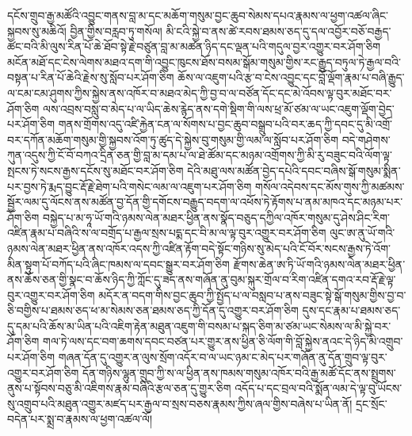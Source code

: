 
\normalsize
{}

{\ti
དངོས་གྲུབ་རྒྱ་མཚོའི་འབྱུང་གནས་བླ་མ་དང་མཆོག་གསུམ་བྱང་ཆུབ་སེམས་དཔའ་རྣམས་ལ་ཕྱག་འཚལ་ཞིང་སྐྱབས་སུ་མཆིའོ།
བྱིན་གྱིས་བརླབ་ཏུ་གསོལ།
མི་ངའི་སྐྱེ་བ་ནས་ཚེ་རབས་ཐམས་ཅད་དུ་དལ་འབྱོར་བཅོ་བརྒྱད་ཚང་བའི་མི་ལུས་རིན་པོ་ཆེ་ཐོབ་སྟེ་རྗེ་བཙུན་བླ་མ་མཚན་ཉིད་དང་ལྡན་པའི་གདུལ་བྱར་འགྱུར་བར་ཤོག་ཅིག
མངོན་མཐོ་དང་ངེས་ལེགས་མཐའ་དག་གི་འབྱུང་ཁུངས་ཐོས་བསམ་སྒོམ་གསུམ་གྱིས་རང་རྒྱུད་བཏུལ་ཏེ་རྒྱལ་བའི་བསྟན་པ་རིན་པོ་ཆེའི་རྗེས་སུ་སློབ་པར་ཤོག་ཅིག
ཆོས་ལ་འཇུག་པའི་རྩ་བ་ངེས་འབྱུང་དང་བློ་ལྡོག་རྣམ་པ་བཞི་རྒྱུད་ལ་ངམ་ངམ་ཤུགས་ཀྱིས་སྐྱེས་ནས་འཁོར་བ་མཐའ་མེད་ཀྱི་བྱ་བ་ལ་བཙོན་དོང་དང་མེ་འོབས་ལྟ་བུར་མཐོང་བར་ཤོག་ཅིག
ལས་འབྲས་བསླུ་བ་མེད་པ་ལ་ཡིད་ཆེས་རྙེད་ནས་དགེ་སྡིག་གི་ལས་ཕྲ་མོ་ཙམ་ལ་ཡང་འཇུག་ལྡོག་བྱེད་པར་ཤོག་ཅིག
གནས་གྲོགས་འདུ་འཛི་རྐྱེན་ངན་ལ་སོགས་པ་བྱང་ཆུབ་བསྒྲུབ་པའི་བར་ཆད་ཀྱི་དབང་དུ་མི་འགྲོ་བར་དཀོན་མཆོག་གསུམ་གྱི་སྐྱབས་འོག་ཏུ་ཚུད་དེ་སྐྱེས་བུ་གསུམ་གྱི་ལམ་ལ་སློབ་པར་ཤོག་ཅིག
བདེ་གཤེགས་ཀུན་འདུས་ཀྱི་ངོ་བོ་བཀའ་དྲིན་ཅན་གྱི་བླ་མ་དམ་པ་ལ་ཐེ་ཚོམ་དང་མཉམ་འགྲོགས་ཀྱི་མི་རུ་བཟུང་བའི་ལོག་ལྟ་སྤངས་ཏེ་སངས་རྒྱས་དངོས་སུ་མཐོང་བར་ཤོག་ཅིག
དེའི་མཐུ་ལས་མཚོན་བྱེད་དཔེའི་དབང་བཞིས་སྒོ་གསུམ་སྨིན་པར་བྱས་ཏེ་རྨད་བྱུང་རྡོ་རྗེ་ཐེག་པའི་གསེང་ལམ་ལ་འཇུག་པར་ཤོག་ཅིག
གསོལ་འདེབས་དང་མོས་གུས་ཀྱི་མཚམས་སྦྱོར་ལམ་དུ་ལོངས་ནས་མཚོན་བྱ་དོན་གྱི་དགོངས་བརྒྱུད་བདག་ལ་འཕོས་ཏེ་རྟོགས་པ་ནམ་མཁའ་དང་མཉམ་པར་ཤོག་ཅིག
བསྐྱེད་པ་མ་ཧཱ་ཡོ་གའི་ཉམས་ལེན་མཐར་ཕྱིན་ནས་སྣོད་བཅུད་དཀྱིལ་འཁོར་གསུམ་དུ་ཤེས་ཤིང་རིག་འཛིན་རྣམ་པ་བཞིའི་ས་ལ་བགྲོད་པ་རྒྱལ་སྲས་པདྨ་དང་བི་མ་ལ་ལྟ་བུར་འགྱུར་བར་ཤོག་ཅིག
ལུང་ཨ་ནུ་ཡོ་གའི་ཉམས་ལེན་མཐར་ཕྱིན་ནས་འཁོར་འདས་ཀྱི་འཛིན་རྟོག་བདེ་སྟོང་གཉིས་སུ་མེད་པའི་ངོ་བོར་སངས་རྒྱས་ཏེ་འོག་མིན་སྟུག་པོ་བཀོད་པའི་ཞིང་ཁམས་ལ་དབང་སྒྱུར་བར་ཤོག་ཅིག
རྫོགས་ཆེན་ཨ་ཏི་ཡོ་གའི་ཉམས་ལེན་མཐར་ཕྱིན་ནས་ཆོས་ཅན་གྱི་སྣང་བ་ཆོས་ཉིད་ཀྱི་ཀློང་དུ་ཟད་ནས་གཞོན་ནུ་བུམ་སྐུར་གྲོལ་བ་རིག་འཛིན་དགའ་རབ་རྡོ་རྗེ་ལྟ་བུར་འགྱུར་བར་ཤོག་ཅིག
མདོར་ན་བདག་གིས་བྱང་ཆུབ་ཀྱི་སྤྱོད་པ་ལ་བསླབ་པ་ནས་བཟུང་སྟེ་སྒོ་གསུམ་གྱིས་བྱ་བ་ཅི་བགྱིས་པ་ཐམས་ཅད་ཕ་མ་སེམས་ཅན་ཐམས་ཅད་ཀྱི་དོན་དུ་འགྱུར་བར་ཤོག་ཅིག
དུས་དང་རྣམ་པ་ཐམས་ཅད་དུ་དམ་པའི་ཆོས་མ་ཡིན་པའི་འཇིག་རྟེན་མཐུན་འཇུག་གི་བསམ་པ་སྐད་ཅིག་མ་ཙམ་ཡང་སེམས་ལ་མི་སྐྱེ་བར་ཤོག་ཅིག
གལ་ཏེ་ལས་དང་བག་ཆགས་དབང་བཙན་པར་གྱུར་ནས་ཕྱིན་ཅི་ལོག་གི་བློ་སྐྱེས་ནའང་དེ་ཉིད་མི་འགྲུབ་པར་ཤོག་ཅིག
གཞན་དོན་དུ་འགྱུར་ན་ལུས་སྲོག་འདོར་བ་ལ་ཡང་ཉམ་ང་མེད་པར་གཞོན་ནུ་དོན་གྲུབ་ལྟ་བུར་འགྱུར་བར་ཤོག་ཅིག
དོན་གཉིས་ལྷུན་གྲུབ་ཀྱི་ས་ལ་ཕྱིན་ནས་ཁམས་གསུམ་འཁོར་བའི་རྒྱ་མཚོ་དོང་ནས་སྤྲུགས་ནུས་པ་སྟོབས་བཅུ་མི་འཇིགས་རྣམ་བཞིའི་རྩལ་ཅན་དུ་གྱུར་ཅིག
འདོད་པ་དང་བྲལ་བའི་སྨོན་ལམ་དེ་ལྟ་བུ་ཡོངས་སུ་འགྲུབ་པའི་མཐུན་འགྱུར་མཛད་པར་རྒྱལ་བ་སྲས་བཅས་རྣམས་ཀྱིས་ཞལ་གྱིས་བཞེས་པ་ཡིན་ནོ།
དྲང་སྲོང་བདེན་པར་སྨྲ་བ་རྣམས་ལ་ཕྱག་འཚལ་ལོ།}\\
